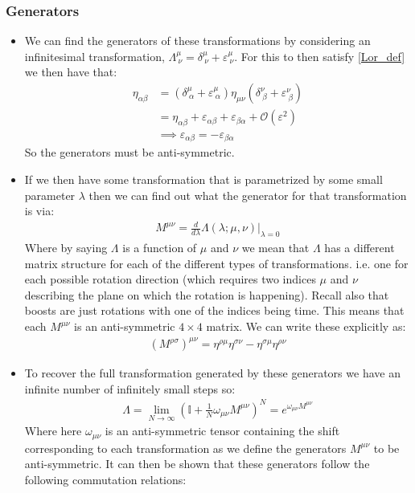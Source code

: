 \documentclass[11pt]{article}
\numberwithin{equation}{section}
\begin{document}
     \subsubsection{Generators}
     \begin{itemize}
       \item We can find the generators of these transformations by considering an infinitesimal transformation, $\Lambda^{\mu}_{~\nu} = \delta^{\mu}_{~\nu} + \varepsilon^{\mu}_{~\nu}$. For this to then satisfy \ref{Lor_def} we then have that:
       \begin{align*}
         \eta_{\alpha\beta} & =  (\delta^{\mu}_{~\alpha} + \varepsilon^{\mu}_{~\alpha})\eta_{\mu\nu}(\delta^{\nu}_{~\beta} + \varepsilon^{\nu}_{~\beta}) \\
         & = \eta_{\alpha\beta} + \varepsilon_{\alpha\beta} + \varepsilon_{\beta\alpha}+ \mathcal{O}(\varepsilon^2) \\
         &\implies   \varepsilon_{\alpha\beta} =-\varepsilon_{\beta\alpha} 
       \end{align*}
       So the generators must be anti-symmetric.

       \item If we then have some transformation that is parametrized by some small parameter $\lambda$ then we can find out what the generator for that transformation is via:
       \begin{align*}
         M^{\mu\nu} = \frac{d}{d\lambda}\Lambda(\lambda;\mu,\nu)\Bigg\vert_{\lambda=0}
       \end{align*}
       Where by saying $\Lambda$ is a function of $\mu$ and $\nu$ we mean that $\Lambda$ has a different matrix structure for each of the different types of transformations. i.e. one for each possible rotation direction (which requires two indices $\mu$ and $\nu$ describing the plane on which the rotation is happening). Recall also that boosts are just rotations with one of the indices being time. This means that each $M^{\mu\nu}$ is an anti-symmetric $4\times4$ matrix. We can write these explicitly as:
       \begin{align}
       \label{M_4x4}
       (M^{\rho\sigma})^{\mu\nu} = \eta^{\rho\mu}\eta^{\sigma\nu}-\eta^{\sigma\mu}\eta^{\rho\nu}
       \end{align}
\item To recover the full transformation generated by these generators we have an infinite number of infinitely small steps so:
       \begin{align*}
         \Lambda = \lim_{N\rightarrow \infty}\left(\mathbb{I}+\frac{1}{N}\omega_{\mu\nu}M^{\mu\nu}\right)^{N} = e^{\omega_{\mu\nu}M^{\mu\nu}}
       \end{align*}
       Where here $\omega_{\mu\nu}$ is an anti-symmetric tensor containing the shift corresponding to each transformation as we define the generators $M^{\mu\nu}$ to be anti-symmetric. It can then be shown that these generators follow the following commutation relations:


\end{itemize}
\end{document}
